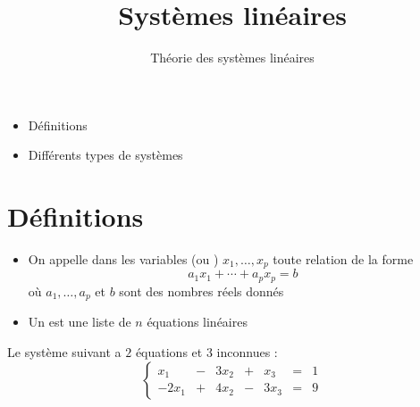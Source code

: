 






\title{{\bf Systèmes linéaires}}
\subtitle{Théorie des systèmes linéaires}

\begin{frame}
  
  \debutmontitre

  \pause

{\footnotesize
\hfill
{}
\begin{minipage}{0.6\textwidth}
  \begin{itemize}
    \item<3-> Définitions
    \item<4-> Différents types de systèmes
  \end{itemize}
\end{minipage}
}

\end{frame}

\setcounter{framenumber}{0}


\section{Définitions}

\begin{frame}
\begin{mydefinition}
\begin{itemize}
  \item On appelle  dans les variables (ou ) 
$x_1,\ldots,x_p$ toute relation de la forme 
$$
  a_1 x_1 + \cdots + a_p x_p = b
$$
où $a_1, \ldots, a_p $ et $b$ sont des nombres réels donnés
\pause
  
  \item Un  est une liste de $n$ équations linéaires
\end{itemize}
\end{mydefinition}

\pause
\medskip

Le système suivant a $2$ équations et $3$ inconnues :
\[ \left\{  \begin{array}{ccccccc}
 x_1 &- &3x_2 &+ &x_3 & =  &1\\
 -2x_1 &+ &4x_2 &- &3x_3 & =  &9
 \end{array} \right.
\]


\end{frame}


